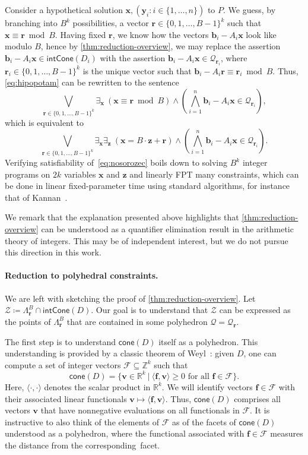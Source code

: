\documentclass{article}
\renewcommand{\geq}{\geqslant}
\newcommand{\Z}{\mathbb{Z}}
\newcommand{\R}{\mathbb{R}}
\newcommand{\tup}[1]{{\mathbf{#1}}}
\newcommand{\xx}{\tup x}
\newcommand{\yy}{\tup y}
\newcommand{\zz}{\tup z}
\newcommand{\bb}{\tup b}
\newcommand{\ff}{\tup f}
\newcommand{\rr}{\tup r}
\newcommand{\myvv}{\tup v} %
\newcommand{\Qq}{\mathcal{Q}}
\newcommand{\Ff}{\mathcal{F}}
\newcommand{\Zz}{\mathcal{Z}}
\newcommand{\sca}[2]{\langle #1,#2\rangle}
\newcommand{\realcone}{\mathsf{cone}}
\newcommand{\intcone}{\mathsf{intCone}}
\begin{document}
Consider a hypothetical solution $\xx,(\yy_i\colon i\in \{1,\ldots,n\})$ to $P$.
We guess, by branching into $B^k$ possibilities, a vector $\rr\in \{0,1,\ldots,B-1\}^k$ such that $\xx\equiv \rr\bmod B$. Having fixed $\rr$, we know how the vectors $\bb_i-A_i\xx$ look like modulo $B$, hence by \cref{thm:reduction-overview}, we may replace the assertion $\bb_i-A_i\xx\in \intcone(D_i)$ with the assertion $\bb_i-A_i\xx \in \Qq_{\rr_i}$, where $\rr_i\in \{0,1,\ldots,B-1\}^k$ is the unique vector such that $\bb_i-A_i\rr\equiv \rr_i\bmod B$. Thus, \eqref{eq:hipopotam} can be rewritten to the sentence
\begin{equation*}
    \bigvee_{\rr\in \{0,1,\ldots,B-1\}^k}
    \exists_{\xx}\ \left(\xx\equiv \rr\bmod B\right) \wedge  \left(\bigwedge_{i=1}^n \bb_i-A_i\xx\in \Qq_{\rr_i}\right),
\end{equation*}
which is equivalent to
\begin{equation}\label{eq:nosorozec}
    \bigvee_{\rr\in \{0,1,\ldots,B-1\}^k}
    \exists_{\xx}\exists_{\zz}\ \left(\xx=B\cdot \zz+\rr\right) \wedge  \left(\bigwedge_{i=1}^n \bb_i-A_i\xx\in \Qq_{\rr_i}\right).
\end{equation}
Verifying satisfiability of~\eqref{eq:nosorozec} boils down to solving $B^k$ integer programs on $2k$ variables $\xx$ and $\zz$ and linearly FPT many constraints, which can be done in linear fixed-parameter time using standard algorithms, for instance that of Kannan~\cite{kannan1987minkowski}.

We remark that the explanation presented above highlights that \cref{thm:reduction-overview} can be understood as a quantifier elimination result in the arithmetic theory of integers. This may be of independent interest, but we do not pursue this direction in this work.

\paragraph*{Reduction to polyhedral constraints.} We are left with sketching the proof of \cref{thm:reduction-overview}. Let $\Zz\coloneqq \Lambda_\rr^B\cap \intcone(D)$. Our goal is to understand that $\Zz$ can be expressed as the points of $\Lambda_\rr^B$ that are contained in some polyhedron $\Qq=\Qq_\rr$.

The first step is to understand $\realcone(D)$ itself as a polyhedron. This understanding is provided by a classic theorem of Weyl~\cite{Weyl35}: given $D$, one can compute a set of integer vectors $\Ff\subseteq \Z^k$ such that
$$\realcone(D)=\{\myvv\in \R^k~|~\sca{\ff}{\myvv}\geq 0\textrm{ for all }\ff\in \Ff\}.$$
Here, $\sca{\cdot}{\cdot}$ denotes the scalar product in $\R^k$. We will identify vectors $\ff\in \Ff$ with their associated linear functionals $\myvv\mapsto \sca{\ff}{\myvv}$. Thus, $\realcone(D)$ comprises all vectors $\myvv$ that have nonnegative evaluations on all functionals in $\Ff$. It is instructive to also think of the elements of $\Ff$ as of the facets of $\realcone(D)$ understood as a polyhedron, where the functional associated with $\ff\in \Ff$ measures the distance from the corresponding~facet.
\end{document}
